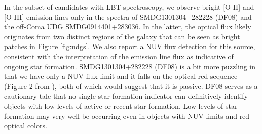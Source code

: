 \documentclass[twocolumn,tighten]{aastex63}
\begin{document}
In the subset of candidates with LBT spectroscopy, we observe bright [O II] and [O III] emission lines only in the spectra of SMDG1301304+282228 (DF08) and the off-Coma UDG SMDG0914401+283036. In the latter, the optical flux likely  originates from two distinct regions of the galaxy that can be seen as bright patches in Figure \ref{fig:udgs}. We also report a NUV flux detection for this source, consistent with the interpretation of the emission line flux as indicative of ongoing star formation. SMDG1301304+282228 (DF08) is a bit more puzzling in that we have only a NUV flux limit and it falls on the optical red sequence (Figure 2 from \citealp{rs}), both of which would suggest that it is passive. DF08 serves as a cautionary tale that no single star formation indicator can definitively identify objects with low levels of active or recent star formation. Low levels of star formation may very well be occurring even in objects with NUV limits and red optical colors.


\end{document}

